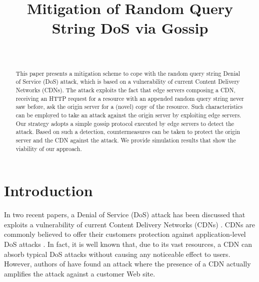 \documentclass{IEEEtran}
\begin{document}
\title{Mitigation of Random Query String DoS via Gossip}

\author{\\
}



\date{}

\maketitle

\begin{abstract}
This paper presents a mitigation scheme to cope with the random query string Denial of Service (DoS) attack, which is based on a vulnerability of current Content Delivery Networks (CDNs). The attack exploits the fact that edge servers composing a CDN, receiving an HTTP request for a resource with an appended random query string never saw before, ask the origin server for a (novel) copy of the resource. Such characteristics can be employed to take an attack against the origin server by exploiting edge servers. Our strategy adopts a simple gossip protocol executed by edge servers to detect the attack. Based on such a detection, countermeasures can be taken to protect the origin server and the CDN against the attack. We provide simulation results that show the viability of our approach.
\end{abstract}




\section{Introduction}

In two recent papers, a Denial of Service (DoS) attack has been discussed that exploits a vulnerability of current Content Delivery Networks (CDNs) \cite{spectrum,original}. CDNs are commonly believed to offer their customers protection against application-level DoS attacks \cite{Poese:2010}. In fact, it is well known that, due to its vast resources, a CDN  can absorb typical DoS attacks without causing any noticeable effect to users. However, authors of \cite{original} have found an attack where the presence of a CDN actually amplifies the attack against a customer Web site. 
\end{document}
